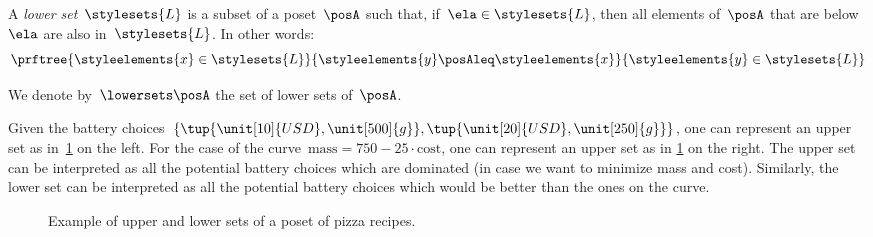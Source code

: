 \begin{definition}
    \label{def:lowerset}
    A \emph{lower set}~$\stylesets{L}$ is a subset of a poset~$\posA$ such that, if~$\ela \in \stylesets{L}$, then all elements of~$\posA$ that are below~$\ela$ are also in~$\stylesets{L}$.
    In other words:
    \begin{equation}
        \prftree{\styleelements{x}\in \stylesets{L}}{\styleelements{y}\posAleq \styleelements{x}}{\styleelements{y}\in \stylesets{L}}
    \end{equation}
\end{definition}
We denote by~$\lowersets \posA$ the set of lower sets of~$\posA$.
%

Given the battery choices~$\{\tup{\unit[10]{USD},\unit[500]{g}},\tup{\unit[20]{USD},\unit[250]{g}}\}$, one can represent an upper set as in~\cref{fig:upperset} on the left.
For the case of the curve~$\text{mass}=750-25\cdot \text{cost}$, one can represent an upper set as in \cref{fig:upperset} on the right.
The upper set can be interpreted as all the potential battery choices which are dominated (in case we want to minimize mass and cost).
Similarly, the lower set can be interpreted as all the potential battery choices which would be better than the ones on the curve.

\begin{figure}[h!]
    \centering
    \caption{Example of upper and lower sets of a poset of pizza recipes.}
    \label{fig:upperset}
\end{figure}

%
